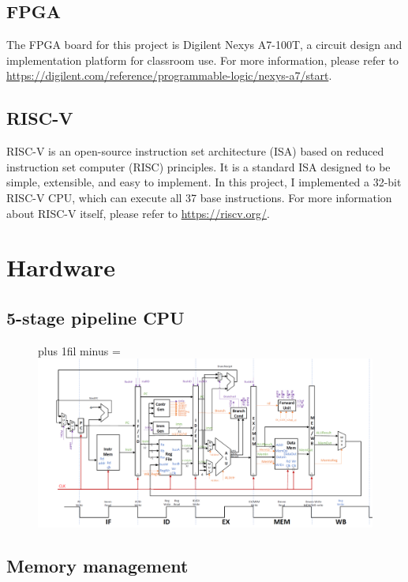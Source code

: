 \documentclass[
	a4paper, %
	11pt, %
]{CSUniSchoolLabReport}
\def\Scentering{\leftskip=0pt plus 1fil minus \Rmargin
                \rightskip=\leftskip}
\begin{document}
\subsection{FPGA}
The FPGA board for this project is Digilent Nexys A7-100T, a circuit design and implementation platform for classroom use. For more information, please refer to \url{https://digilent.com/reference/programmable-logic/nexys-a7/start}.

\subsection{RISC-V}
RISC-V is an open-source instruction set architecture (ISA) based on reduced instruction set computer (RISC) principles. It is a standard ISA designed to be simple, extensible, and easy to implement. In this project, I implemented a 32-bit RISC-V CPU, which can execute all 37 base instructions. For more information about RISC-V itself, please refer to \url{https://riscv.org/}.
\section{Hardware}

\subsection{5-stage pipeline CPU}
\begin{figure}[htbp]
    \Scentering
    \includegraphics[width=.9\paperwidth]{image2.png}
    \caption{}
    \label{fig:image2}
\end{figure}

\subsection{Memory management}
\end{document}
